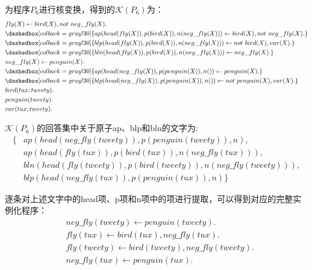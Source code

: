     \begin{example}[程序$P_6$的核变换]
        为程序$P_6$进行核变换，得到的$\mathcal{K}(P_6)$为：
        \begin{align*}
            &fly(X) \leftarrow bird(X), not\ neg\_fly(X).\\
            &\dashedbox[colback=gray!30]{ap(head(fly(X)), p(bird(X)), n(neg\_fly(X))) \leftarrow bird(X), not\ neg\_fly(X).}\\
            &\dashedbox[colback=gray!30]{blp(head(fly(X)), p(bird(X)), n(neg\_fly(X))) \leftarrow not\ bird(X), var(X).}\\
            &\dashedbox[colback=gray!30]{bln(head(fly(X)), p(bird(X)), n(neg\_fly(X))) \leftarrow neg\_fly(X).}\\
            &neg\_fly(X) \leftarrow penguin(X).\\
            &\dashedbox[colback=gray!30]{ap(head(neg\_fly(X)), p(penguin(X)), n()) \leftarrow penguin(X).}\\
            &\dashedbox[colback=gray!30]{blp(head(neg\_fly(X)), p(penguin(X)), n()) \leftarrow not\ penguin(X), var(X).}\\
            &bird(tux;tweety).\\
            &penguin(tweety).\\
            &var(tux;tweety).
        \end{align*}
    
        $\mathcal{K}(P_6)$的回答集中关于原子ap、blp和bln的文字为:
    \begin{align*}
        \{&ap(head(neg\_fly(tweety)),p(penguin(tweety)),n),\\
        &ap(head(fly(tux)),p(bird(tux)),n(neg\_fly(tux))),\\
        &bln(head(fly(tweety)),p(bird(tweety)),n(neg\_fly(tweety))),\\
        &blp(head(neg\_fly(tux)),p(penguin(tux)),n)\}
    \end{align*}
    
    逐条对上述文字中的head项、p项和n项中的项进行提取，可以得到对应的完整实例化程序：
    \begin{align*}
        &neg\_fly(tweety) \leftarrow penguin(tweety).\\
        &fly(tux) \leftarrow bird(tux), neg\_fly(tux).\\
        &fly(tweety) \leftarrow bird(tweety), neg\_fly(tweety).\\
        &neg\_fly(tux) \leftarrow penguin(tux).
    \end{align*}
    \end{example}


